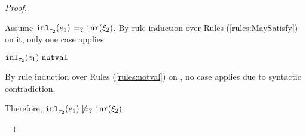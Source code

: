 \begin{proof}
\begin{byCases}
\begin{byCases}
        Assume $\mathtt{inl}_{\tau_2}({e_1}) \models_{?} \mathtt{inr}(\xi_2)$. By rule induction over Rules (\ref{rules:MaySatisfy}) on it, only one case applies.
        \begin{byCases}
        \item[\text{(\ref{rule:CMSNotVal})}]
            \begin{pfsteps*}
            \item $\mathtt{inl}_{\tau_2}({e_1}) ~\mathtt{notval}$  
            \end{pfsteps*}
            By rule induction over Rules (\ref{rules:notval}) on , no case applies due to syntactic contradiction.
        \end{byCases}
        Therefore, $\mathtt{inl}_{\tau_2}({e_1}) \not\models_{?} \mathtt{inr}(\xi_2)$.
        

\end{byCases}
\end{byCases}
\end{proof}
